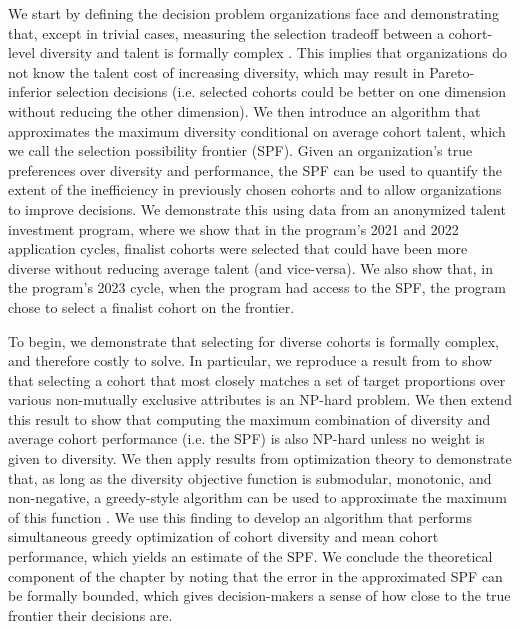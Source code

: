 We start by defining the decision problem organizations face and demonstrating that, except in trivial cases, measuring the selection tradeoff between a cohort-level diversity and talent is formally complex \cite{nemhauser1978analysis}. This implies that organizations do not know the talent cost of increasing diversity, which may result in Pareto-inferior selection decisions (i.e. selected cohorts could be better on one dimension without reducing the other dimension). We then introduce an algorithm that approximates the maximum diversity conditional on average cohort talent, which we call the selection possibility frontier (SPF). Given an organization's true preferences over diversity and performance, the SPF can be used to quantify the extent of the inefficiency in previously chosen cohorts and to allow organizations to improve decisions. We demonstrate this using data from an anonymized talent investment program, where we show that in the program's 2021 and 2022 application cycles, finalist cohorts were selected that could have been more diverse without reducing average talent (and vice-versa). We also show that, in the program's 2023 cycle, when the program had access to the SPF, the program chose to select a finalist cohort on the frontier. 

To begin, we demonstrate that selecting for diverse cohorts is formally complex, and therefore costly to solve. In particular, we reproduce a result from \textcite{huppenkothen2020entrofy} to show that selecting a cohort that most closely matches a set of target proportions over various non-mutually exclusive attributes is an NP-hard problem. We then extend this result to show that computing the maximum combination of diversity and average cohort performance (i.e. the SPF) is also NP-hard unless no weight is given to diversity. We then apply results from optimization theory to demonstrate that, as long as the diversity objective function is submodular, monotonic, and non-negative, a greedy-style algorithm can be used to approximate the maximum of this function \cite{huppenkothen2020entrofy}. We use this finding to develop an algorithm that performs simultaneous greedy optimization of cohort diversity and mean cohort performance, which yields an estimate of the SPF. We conclude the theoretical component of the chapter by noting that the error in the approximated SPF can be formally bounded, which gives decision-makers a sense of how close to the true frontier their decisions are. 

